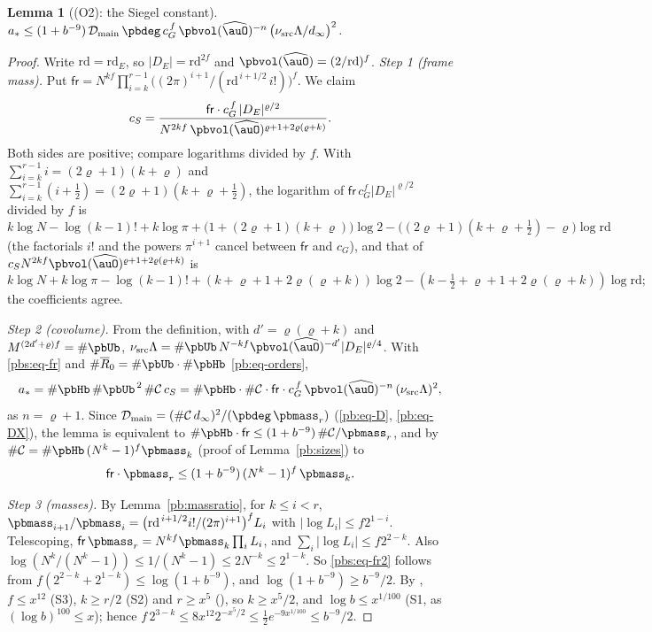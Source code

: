 \documentclass[10pt]{amsart}
\newtheorem{lemma}[theorem]{Lemma}
\theoremstyle{definition}
\theoremstyle{remark}
\providecommand{\pbDmain}{\mathcal D_{\mathrm{main}}}
\providecommand{\pbR}{\overline R_0}
\begin{document}
\begin{lemma}[(O2): the Siegel constant]\label{pbs:O2}
$a_*\le(1+b^{-9})\,\pbDmain\,\pbdeg\,c_G^{\,f}\,\pbvol(\widehat\auO)^{-n}\,\bigl(\nu_{\mathrm{src}}\Lambda/
d_\infty\bigr)^2$.
\end{lemma}
\begin{proof}
Write $\mathrm{rd}=\mathrm{rd}_E$, so $|D_E|=\mathrm{rd}^{2f}$ and $\pbvol(\widehat\auO)=(2/\mathrm{rd})^f$.
\emph{Step 1 (frame mass).} Put $\mathsf{fr}=N^{kf}\prod_{i=k}^{r-1}\bigl((2\pi)^{i+1}/(\mathrm{rd}^{\,i+1/2}
\,i!)\bigr)^f$. We claim
\begin{equation}\label{pbs:eq-fr}
c_S=\frac{\mathsf{fr}\cdot c_G^{\,f}\,|D_E|^{\varrho/2}}{N^{2kf}\,\pbvol(\widehat\auO)^{\varrho+1+2\varrho(
\varrho+k)}} .
\end{equation}
Both sides are positive; compare logarithms divided by $f$. With $\sum_{i=k}^{r-1}i=(2\varrho+1)(k+\varrho)$
and $\sum_{i=k}^{r-1}(i+\frac12)=(2\varrho+1)(k+\varrho+\frac12)$, the logarithm of $\mathsf{fr}\,c_G^f
|D_E|^{\varrho/2}$ divided by $f$ is
\[
k\log N-\log(k-1)!+k\log\pi+\bigl(1+(2\varrho+1)(k+\varrho)\bigr)\log2-\bigl((2\varrho+1)(k+\varrho+\tfrac12)-\varrho
\bigr)\log\mathrm{rd}
\]
(the factorials $i!$ and the powers $\pi^{i+1}$ cancel between $\mathsf{fr}$ and $c_G$), and that of
$c_SN^{2kf}\pbvol(\widehat\auO)^{\varrho+1+2\varrho(\varrho+k)}$ is
\[
k\log N+k\log\pi-\log(k-1)!+(k+\varrho+1+2\varrho(\varrho+k))\log2-(k-\tfrac12+\varrho+1+2\varrho(\varrho+k))
\log\mathrm{rd};
\]
the coefficients agree.

\emph{Step 2 (covolume).} From the definition, with $d'=\varrho(\varrho+k)$ and $M^{(2d'+\varrho)f}=\#\pbUb$,
$\nu_{\mathrm{src}}\Lambda=\#\pbUb\,\allowbreak N^{-kf}\pbvol(\widehat\auO)^{-d'}|D_E|^{\varrho/4}$. With
\eqref{pbs:eq-fr} and $\#\pbR=\#\pbUb\cdot\#\pbHb$ \eqref{pb:eq-orders},
\[
a_*=\#\pbHb\,\#\pbUb^{\,2}\,\#\mathcal C\,c_S=\#\pbHb\cdot\#\mathcal C\cdot\mathsf{fr}\cdot c_G^{\,f}\,
\pbvol(\widehat\auO)^{-n}\,(\nu_{\mathrm{src}}\Lambda)^2 ,
\]
as $n=\varrho+1$. Since $\pbDmain=(\#\mathcal C\,d_\infty)^2/(\pbdeg\,\pbmass_r)$ (\eqref{pb:eq-D},
\eqref{pb:eq-DX}), the lemma is equivalent to $\#\pbHb\cdot\mathsf{fr}\le(1+b^{-9})\,\#\mathcal C/\pbmass_r$, and
by $\#\mathcal C=\#\pbHb\,(N^k-1)^f\pbmass_k$ (proof of Lemma~\ref{pb:sizes}) to
\begin{equation}\label{pbs:eq-fr2}
\mathsf{fr}\cdot\pbmass_r\le(1+b^{-9})\,(N^k-1)^f\,\pbmass_k .
\end{equation}

\emph{Step 3 (masses).} By Lemma~\ref{pb:massratio}, for $k\le i<r$, $\pbmass_{i+1}/\pbmass_i=\bigl(\mathrm
{rd}^{\,i+1/2}i!/(2\pi)^{i+1}\bigr)^fL_i$ with $|\log L_i|\le f2^{1-i}$. Telescoping, $\mathsf{fr}\,\pbmass_r=
N^{kf}\pbmass_k\prod_iL_i$, and $\sum_i|\log L_i|\le f2^{2-k}$. Also $\log(N^k/(N^k-1))\le1/(N^k-1)\le2N^{-k}
\le2^{1-k}$. So \eqref{pbs:eq-fr2} follows from $f(2^{2-k}+2^{1-k})\le\log(1+b^{-9})$, and $\log(1+b^{-9})\ge
b^{-9}/2$. By {\cite[Lemma~13.4]{P46}}, $f\le x^{12}$ (S3), $k\ge r/2$ (S2) and $r\ge x^5$ ({\cite[Definition~13.3]{P46}}), so $k\ge x^5/2$, and $\log b\le x^{1/100}$
(S1, as $(\log b)^{100}\le x$); hence $f\,2^{3-k}\le8x^{12}2^{-x^5/2}\le\frac12e^{-9x^{1/100}}\le b^{-9}/2$.
\end{proof}
\end{document}
